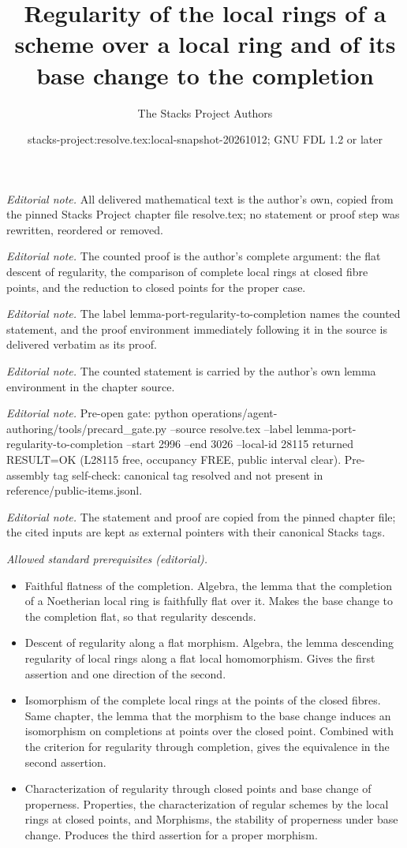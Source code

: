\documentclass[10pt,a4paper]{amsart}
\title{Regularity of the local rings of a scheme over a local ring and of its base change to the completion}
\author{The Stacks Project Authors}
\date{stacks-project:resolve.tex:local-snapshot-20261012; GNU FDL 1.2 or later}
\theoremstyle{plain}
\theoremstyle{definition}
\theoremstyle{remark}
\numberwithin{equation}{subsection}
\begin{document}
\maketitle
\noindent\textit{Editorial note.} All delivered mathematical text is the author's own, copied from the pinned Stacks Project chapter file resolve.tex; no statement or proof step was rewritten, reordered or removed.\par\medskip
\noindent\textit{Editorial note.} The counted proof is the author's complete argument: the flat descent of regularity, the comparison of complete local rings at closed fibre points, and the reduction to closed points for the proper case.\par\medskip
\noindent\textit{Editorial note.} The label lemma-port-regularity-to-completion names the counted statement, and the proof environment immediately following it in the source is delivered verbatim as its proof.\par\medskip
\noindent\textit{Editorial note.} The counted statement is carried by the author's own lemma environment in the chapter source.\par\medskip
\noindent\textit{Editorial note.} Pre-open gate: python operations/agent-authoring/tools/precard\_gate.py --source resolve.tex --label lemma-port-regularity-to-completion --start 2996 --end 3026 --local-id 28115 returned RESULT=OK (L28115 free, occupancy FREE, public interval clear). Pre-assembly tag self-check: canonical tag resolved and not present in reference/public-items.jsonl.\par\medskip
\noindent\textit{Editorial note.} The statement and proof are copied from the pinned chapter file; the cited inputs are kept as external pointers with their canonical Stacks tags.\par\medskip
\noindent\textit{Allowed standard prerequisites (editorial).}\begin{itemize}
\item Faithful flatness of the completion. Algebra, the lemma that the completion of a Noetherian local ring is faithfully flat over it. Makes the base change to the completion flat, so that regularity descends.
\item Descent of regularity along a flat morphism. Algebra, the lemma descending regularity of local rings along a flat local homomorphism. Gives the first assertion and one direction of the second.
\item Isomorphism of the complete local rings at the points of the closed fibres. Same chapter, the lemma that the morphism to the base change induces an isomorphism on completions at points over the closed point. Combined with the criterion for regularity through completion, gives the equivalence in the second assertion.
\item Characterization of regularity through closed points and base change of properness. Properties, the characterization of regular schemes by the local rings at closed points, and Morphisms, the stability of properness under base change. Produces the third assertion for a proper morphism.
\end{itemize}\medskip
\end{document}
